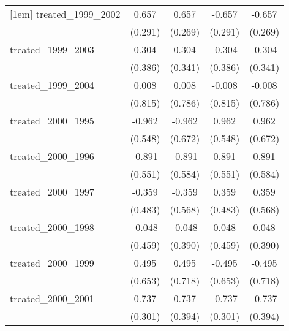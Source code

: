 {\begin{tabular}{l*{4}{c}}
[1em]
treated\_1999\_2002&       0.657\sym{*}  &       0.657\sym{*}  &      -0.657\sym{*}  &      -0.657\sym{*}  \\
            &     (0.291)         &     (0.269)         &     (0.291)         &     (0.269)         \\
[1em]
treated\_1999\_2003&       0.304         &       0.304         &      -0.304         &      -0.304         \\
            &     (0.386)         &     (0.341)         &     (0.386)         &     (0.341)         \\
[1em]
treated\_1999\_2004&       0.008         &       0.008         &      -0.008         &      -0.008         \\
            &     (0.815)         &     (0.786)         &     (0.815)         &     (0.786)         \\
[1em]
treated\_2000\_1995&      -0.962         &      -0.962         &       0.962         &       0.962         \\
            &     (0.548)         &     (0.672)         &     (0.548)         &     (0.672)         \\
[1em]
treated\_2000\_1996&      -0.891         &      -0.891         &       0.891         &       0.891         \\
            &     (0.551)         &     (0.584)         &     (0.551)         &     (0.584)         \\
[1em]
treated\_2000\_1997&      -0.359         &      -0.359         &       0.359         &       0.359         \\
            &     (0.483)         &     (0.568)         &     (0.483)         &     (0.568)         \\
[1em]
treated\_2000\_1998&      -0.048         &      -0.048         &       0.048         &       0.048         \\
            &     (0.459)         &     (0.390)         &     (0.459)         &     (0.390)         \\
[1em]
treated\_2000\_1999&       0.495         &       0.495         &      -0.495         &      -0.495         \\
            &     (0.653)         &     (0.718)         &     (0.653)         &     (0.718)         \\
[1em]
treated\_2000\_2001&       0.737\sym{*}  &       0.737         &      -0.737\sym{*}  &      -0.737         \\
            &     (0.301)         &     (0.394)         &     (0.301)         &     (0.394)         \\

\end{tabular}}
